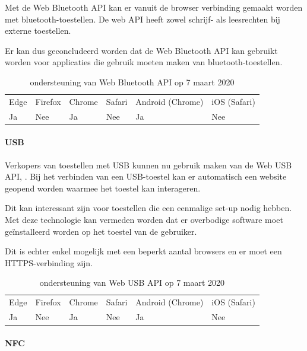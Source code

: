 	Met de Web Bluetooth API \autocite{Grant2020} kan er vanuit de browser verbinding gemaakt worden met bluetooth-toestellen. De web API heeft zowel schrijf- als leesrechten bij externe toestellen. 
	
	Er kan dus geconcludeerd worden dat de Web Bluetooth API kan gebruikt worden voor applicaties die gebruik moeten maken van bluetooth-toestellen.
	\autocite{Beaufort2019a}
	
	\begin{table}[H]
		\centering
		\begin{tabular}{llllll}
			Edge & Firefox & Chrome & Safari & Android (Chrome) & iOS (Safari) \\
			Ja   & Nee      & Ja     & Nee     & Ja               & Nee          
		\end{tabular}	
		\caption{ondersteuning van Web Bluetooth API op 7 maart 2020}
	\end{table}
	
	
	
	\paragraph{USB}
	
	Verkopers van toestellen met USB kunnen nu gebruik maken van de Web USB API, \autocite{Rockot2020}. Bij het verbinden van een USB-toestel kan er automatisch een website geopend worden waarmee het toestel kan interageren.
	 
	Dit kan interessant zijn voor toestellen die een eenmalige set-up nodig hebben. Met deze technologie kan vermeden worden dat er overbodige software moet geïnstalleerd worden op het toestel van de gebruiker. 
	
	Dit is echter enkel mogelijk met een beperkt aantal browsers en er moet een HTTPS-verbinding zijn.
	\autocite{Beaufort2019b}
	
	\begin{table}[H]
		\centering
		\begin{tabular}{llllll}
			Edge & Firefox & Chrome & Safari & Android (Chrome) & iOS (Safari) \\
			Ja   & Nee      & Ja     & Nee     & Ja               & Nee          
		\end{tabular}	
		\caption{ondersteuning van Web USB API op 7 maart 2020}
	\end{table}
	
	
	\paragraph{NFC}
	
